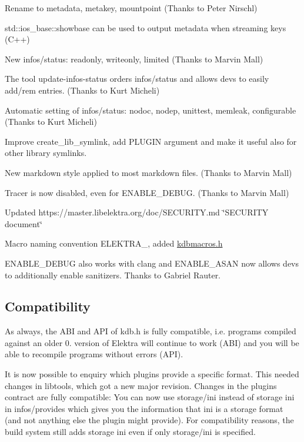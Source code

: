 \begin{DoxyItemize}
\item Rename to metadata, metakey, mountpoint (Thanks to Peter Nirschl)
\item std\+::ios\+\_\+base\+::showbase can be used to output metadata when streaming keys (C++)
\item New {\ttfamily infos/status}\+: {\ttfamily readonly}, {\ttfamily writeonly}, {\ttfamily limited} (Thanks to Marvin Mall)
\item The tool {\ttfamily update-\/infos-\/status} orders {\ttfamily infos/status} and allows devs to easily add/rem entries. (Thanks to Kurt Micheli)
\item Automatic setting of {\ttfamily infos/status}\+: {\ttfamily nodoc}, {\ttfamily nodep}, {\ttfamily unittest}, {\ttfamily memleak}, {\ttfamily configurable} (Thanks to Kurt Micheli)
\item Improve {\ttfamily create\+\_\+lib\+\_\+symlink}, add {\ttfamily P\+L\+U\+G\+IN} argument and make it useful also for other library symlinks.
\item New markdown style applied to most markdown files. (Thanks to Marvin Mall)
\item Tracer is now disabled, even for {\ttfamily E\+N\+A\+B\+L\+E\+\_\+\+D\+E\+B\+UG}. (Thanks to Marvin Mall)
\item Updated https\+://master.libelektra.\+org/doc/\+S\+E\+C\+U\+R\+I\+TY.md \char`\"{}\+S\+E\+C\+U\+R\+I\+T\+Y document\char`\"{}
\item Macro naming convention {\ttfamily E\+L\+E\+K\+T\+R\+A\+\_\+}, added {\ttfamily \hyperlink{kdbmacros_8h}{kdbmacros.\+h}}
\item {\ttfamily E\+N\+A\+B\+L\+E\+\_\+\+D\+E\+B\+UG} also works with {\ttfamily clang} and {\ttfamily E\+N\+A\+B\+L\+E\+\_\+\+A\+S\+AN} now allows devs to additionally enable sanitizers. Thanks to Gabriel Rauter.
\end{DoxyItemize}

\subsection*{Compatibility}

As always, the A\+BI and A\+PI of kdb.\+h is fully compatible, i.\+e. programs compiled against an older 0. version of Elektra will continue to work (A\+BI) and you will be able to recompile programs without errors (A\+PI).

It is now possible to enquiry which plugins provide a specific format. This needed changes in libtools, which got a new major revision. Changes in the plugin\textquotesingle{}s contract are fully compatible\+: You can now use {\ttfamily storage/ini} instead of {\ttfamily storage ini} in {\ttfamily infos/provides} which gives you the information that {\ttfamily ini} is a storage format (and not anything else the plugin might provide). For compatibility reasons, the build system still adds {\ttfamily storage ini} even if only {\ttfamily storage/ini} is specified.

